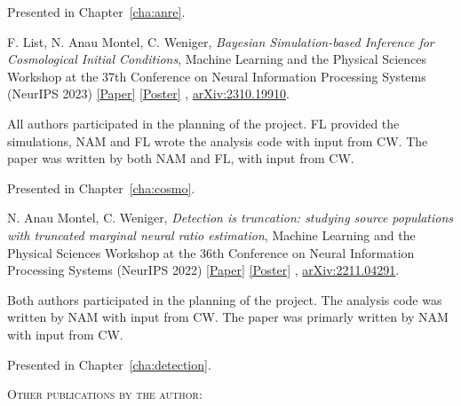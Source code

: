 \begin{itemize}[]
{Presented in Chapter~\ref{cha:anre}. \vskip 10pt


\item[\cite{List:2023aa}] 
F. List, {N. Anau Montel}, C. Weniger, \textit{Bayesian Simulation-based Inference for Cosmological Initial Conditions}, Machine Learning and the Physical Sciences Workshop at the 37th Conference on Neural Information Processing Systems (NeurIPS 2023) \href{https://ml4physicalsciences.github.io/2023/files/NeurIPS_ML4PS_2023_218.pdf}{[Paper]} \href{https://nips.cc/media/PosterPDFs/NeurIPS%202023/76248.png}{[Poster]} ,  \href{https://arxiv.org/abs/2310.19910}{\ttfamily arXiv:2310.19910}.  \vskip 5pt

{All authors participated in the planning of the project. FL provided the simulations, NAM and FL wrote the analysis code with input from CW. The paper was written by both NAM and FL, with input from CW.}   \vskip 5pt

Presented in Chapter~\ref{cha:cosmo}. \vskip 10pt


\item[\cite{AnauMontel:2022ppb}] 
{N. Anau Montel}, C. Weniger, \textit{Detection is truncation: studying source populations with truncated marginal neural ratio estimation}, Machine Learning and the Physical Sciences Workshop at the 36th Conference on Neural Information Processing Systems (NeurIPS 2022) \href{https://ml4physicalsciences.github.io/2022/files/NeurIPS_ML4PS_2022_50.pdf}{[Paper]} \href{https://neurips.cc/media/PosterPDFs/NeurIPS%202022/57017.png}{[Poster]} , \href{https://arxiv.org/abs/2211.04291}{\ttfamily arXiv:2211.04291}.  \vskip 5pt

{Both authors participated in the planning of the project. The analysis code was written by NAM with input from CW. The paper was primarly written by NAM with input from CW.}   \vskip 5pt

Presented in Chapter~\ref{cha:detection}. \vskip 10pt

}

\end{itemize}


{\scshape Other publications by the author:} \vskip 20pt

